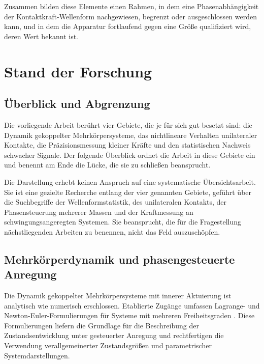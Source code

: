 \documentclass[12pt,a4paper]{report}
\begin{document}
Zusammen bilden diese Elemente einen Rahmen, in dem eine
Phasenabhängigkeit der Kontaktkraft-Wellenform nachgewiesen, begrenzt
oder ausgeschlossen werden kann, und in dem die Apparatur fortlaufend
gegen eine Größe qualifiziert wird, deren Wert bekannt ist.


\chapter{Stand der Forschung}
\label{chap:stand}

\section{Überblick und Abgrenzung}

Die vorliegende Arbeit berührt vier Gebiete, die je für sich gut besetzt
sind: die Dynamik gekoppelter Mehrkörpersysteme, das nichtlineare
Verhalten unilateraler Kontakte, die Präzisionsmessung kleiner Kräfte und
den statistischen Nachweis schwacher Signale. Der folgende Überblick
ordnet die Arbeit in diese Gebiete ein und benennt am Ende die Lücke, die
sie zu schließen beansprucht.

Die Darstellung erhebt keinen Anspruch auf eine systematische
Übersichtsarbeit. Sie ist eine gezielte Recherche entlang der vier
genannten Gebiete, geführt über die Suchbegriffe der
Wellenformstatistik, des unilateralen Kontakts, der Phasensteuerung
mehrerer Massen und der Kraftmessung an schwingungsangeregten Systemen.
Sie beansprucht, die für die Fragestellung nächstliegenden Arbeiten zu
benennen, nicht das Feld auszuschöpfen.

\section{Mehrkörperdynamik und phasengesteuerte Anregung}

Die Dynamik gekoppelter Mehrkörpersysteme mit innerer Aktuierung ist
analytisch wie numerisch erschlossen. Etablierte Zugänge umfassen
Lagrange- und Newton-Euler-Formulierungen für Systeme mit mehreren
Freiheitsgraden \cite{lanczos1986, featherstone2008, shabana2010}. Diese
Formulierungen liefern die Grundlage für die Beschreibung der
Zustandsentwicklung unter gesteuerter Anregung und rechtfertigen die
Verwendung verallgemeinerter Zustandsgrößen und parametrischer
Systemdarstellungen.
\end{document}
